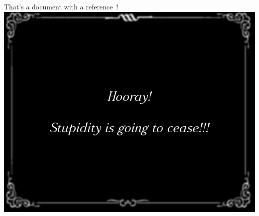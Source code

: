 \documentclass[a4paper,10pt]{scrreprt}
\begin{document}
That's a document with a reference~\cite{wolfien2016}!\\
\includegraphics[width=.9\textwidth]{img/some-image.jpg}\\



\end{document}

